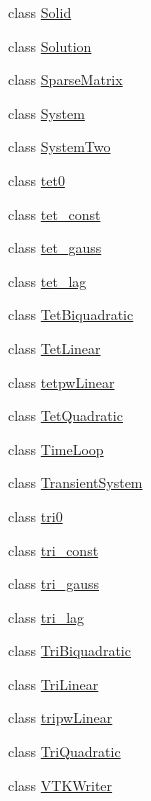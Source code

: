 \begin{DoxyCompactItemize}
class \mbox{\hyperlink{classfemus_1_1_solid}{Solid}}
\item 
class \mbox{\hyperlink{classfemus_1_1_solution}{Solution}}
\item 
class \mbox{\hyperlink{classfemus_1_1_sparse_matrix}{Sparse\+Matrix}}
\item 
class \mbox{\hyperlink{classfemus_1_1_system}{System}}
\item 
class \mbox{\hyperlink{classfemus_1_1_system_two}{System\+Two}}
\item 
class \mbox{\hyperlink{classfemus_1_1tet0}{tet0}}
\item 
class \mbox{\hyperlink{classfemus_1_1tet__const}{tet\+\_\+const}}
\item 
class \mbox{\hyperlink{classfemus_1_1tet__gauss}{tet\+\_\+gauss}}
\item 
class \mbox{\hyperlink{classfemus_1_1tet__lag}{tet\+\_\+lag}}
\item 
class \mbox{\hyperlink{classfemus_1_1_tet_biquadratic}{Tet\+Biquadratic}}
\item 
class \mbox{\hyperlink{classfemus_1_1_tet_linear}{Tet\+Linear}}
\item 
class \mbox{\hyperlink{classfemus_1_1tetpw_linear}{tetpw\+Linear}}
\item 
class \mbox{\hyperlink{classfemus_1_1_tet_quadratic}{Tet\+Quadratic}}
\item 
class \mbox{\hyperlink{classfemus_1_1_time_loop}{Time\+Loop}}
\item 
class \mbox{\hyperlink{classfemus_1_1_transient_system}{Transient\+System}}
\item 
class \mbox{\hyperlink{classfemus_1_1tri0}{tri0}}
\item 
class \mbox{\hyperlink{classfemus_1_1tri__const}{tri\+\_\+const}}
\item 
class \mbox{\hyperlink{classfemus_1_1tri__gauss}{tri\+\_\+gauss}}
\item 
class \mbox{\hyperlink{classfemus_1_1tri__lag}{tri\+\_\+lag}}
\item 
class \mbox{\hyperlink{classfemus_1_1_tri_biquadratic}{Tri\+Biquadratic}}
\item 
class \mbox{\hyperlink{classfemus_1_1_tri_linear}{Tri\+Linear}}
\item 
class \mbox{\hyperlink{classfemus_1_1tripw_linear}{tripw\+Linear}}
\item 
class \mbox{\hyperlink{classfemus_1_1_tri_quadratic}{Tri\+Quadratic}}
\item 
class \mbox{\hyperlink{classfemus_1_1_v_t_k_writer}{V\+T\+K\+Writer}}

\end{DoxyCompactItemize}
